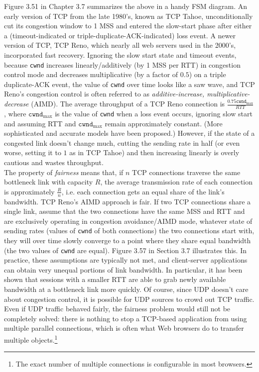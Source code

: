 \documentclass[table, xcdraw]{article}%
\begin{document}
\begin{itemize}
    Figure 3.51 in Chapter 3.7 summarizes the above in a handy FSM diagram. An early version of TCP from the late 1980's, known as TCP Tahoe, unconditionally cut its congestion window to 1 MSS and entered the slow-start phase after either a (timeout-indicated or triple-duplicate-ACK-indicated) loss event. A newer version of TCP, TCP Reno, which nearly all web servers used in the 2000's, incorporated fast recovery. Ignoring the slow start state and timeout events, because \texttt{cwnd} increases linearly/additively (by 1 MSS per RTT) in congestion control mode and decreases multiplicative (by a factor of $0.5$) on a triple duplicate-ACK event, the value of \texttt{cwnd} over time looks like a saw wave, and TCP Reno's congestion control is often referred to as \emph{additive-increase, multiplicative-decrease} (AIMD). The average throughput of a TCP Reno connection is $\frac{0.75 \mathtt{cwnd}_\text{max}}{RTT}$, where $\mathtt{cwnd}_\text{max}$ is the value of \texttt{cwnd} when a loss event occurs, ignoring slow start and assuming RTT and $\mathtt{cwnd}_\text{max}$ remain approximately constant. (More sophisticated and accurate models have been proposed.) However, if the state of a congested link doesn't change much, cutting the sending rate in half (or even worse, setting it to $1$ as in TCP Tahoe) and then increasing linearly is overly cautious and wastes throughput.\\
    The property of \emph{fairness} means that, if $n$ TCP connections traverse the same bottleneck link with capacity $R$, the average transmission rate of each connection is approximately $\frac{R}{n}$, i.e. each connection gets an equal share of the link's bandwidth. TCP Reno's AIMD approach is fair. If two TCP connections share a single link, assume that the two connections have the same MSS and RTT and are exclusively operating in congestion avoidance/AIMD mode, whatever state of sending rates (values of \texttt{cwnd} of both connections) the two connections start with, they will over time slowly converge to a point where they share equal bandwidth (the two values of \texttt{cwnd} are equal). Figure 3.57 in Section 3.7 illustrates this. In practice, these assumptions are typically not met, and client-server applications can obtain very unequal portions of link bandwidth. In particular, it has been shown that sessions with a smaller RTT are able to grab newly available bandwidth at a bottleneck link more quickly. Of course, since UDP doesn't care about congestion control, it is possible for UDP sources to crowd out TCP traffic. Even if UDP traffic behaved fairly, the fairness problem would still not be completely solved: there is nothing to stop a TCP-based application from using multiple parallel connections, which is often what Web browsers do to transfer multiple objects.\footnote{The exact number of multiple connections is configurable in most browsers.}\\

\end{itemize}
\end{document}
